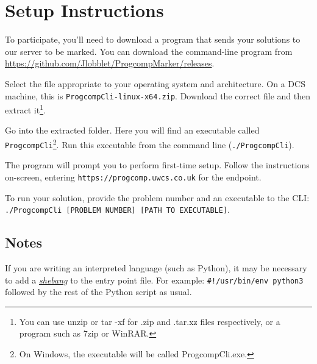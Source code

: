 \section*{Setup Instructions}

To participate, you'll need to download a program that sends your solutions to our server to be marked.
You can download the command-line program from \url{https://github.com/Jlobblet/ProgcompMarker/releases}.

Select the file appropriate to your operating system and architecture.
On a DCS machine, this is \verb|ProgcompCli-linux-x64.zip|.
Download the correct file and then extract it\footnote{You can use {\ttfamily unzip} or {\ttfamily tar -xf} for {\ttfamily .zip} and {\ttfamily .tar.xz} files respectively, or a program such as 7zip or WinRAR.}.

Go into the extracted folder.
Here you will find an executable called \verb|ProgcompCli|\footnote{On Windows, the executable will be called {\ttfamily ProgcompCli.exe}.}.
Run this executable from the command line (\verb|./ProgcompCli|).

The program will prompt you to perform first-time setup.
Follow the instructions on-screen, entering \verb|https://progcomp.uwcs.co.uk| for the endpoint.

To run your solution, provide the problem number and an executable to the CLI: \verb|./ProgcompCli [PROBLEM NUMBER] [PATH TO EXECUTABLE]|.


\subsection*{Notes}

If you are writing an interpreted language (such as Python), it may be necessary to add a \href{https://en.wikipedia.org/wiki/Shebang_(Unix)}{\em shebang} to the entry point file.
For example: \verb|#!/usr/bin/env python3| followed by the rest of the Python script as usual.
